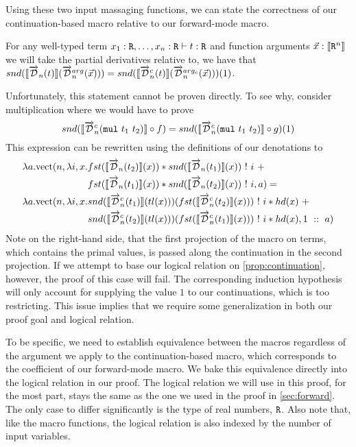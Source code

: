   Using these two input massaging functions, we can state the correctness of our continuation-based macro relative to our forward-mode macro.
  \begin{proposition}\label{prop:continuation}
    For any well-typed term $x_1 : \texttt{R}, \dots, x_n : \texttt{R} \vdash t : \texttt{R}$ and function arguments $\vec{x} : \llbracket \texttt{R}^n \rrbracket$ we will take the partial derivatives relative to, we have that $snd(\llbracket\overrightarrow{\mathcal{D}}_n(t)\rrbracket (\overrightarrow{\mathcal{D}}^{arg}_n(\vec{x}))) = snd(\llbracket\overrightarrow{\mathcal{D}}^c_n(t)\rrbracket (\overrightarrow{\mathcal{D}}^{arg_c}_n(\vec{x})))(1)$.
  \end{proposition}
  Unfortunately, this statement cannot be proven directly.
  To see why, consider multiplication where we would have to prove
  \begin{equation*}
    snd(\llbracket \overrightarrow{\mathcal{D}}^c_n(\texttt{mul}\ t_1\ t_2) \rrbracket \circ f)= snd(\llbracket \overrightarrow{\mathcal{D}}^c_n(\texttt{mul}\ t_1\ t_2) \rrbracket \circ g)(1)
  \end{equation*}
  This expression can be rewritten using the definitions of our denotations to
  \begin{align*}
    \lambda a. \text{vect}(n, \lambda i, x. &fst(\llbracket \overrightarrow{\mathcal{D}}_n(t_2) \rrbracket(x)) * snd(\llbracket \overrightarrow{\mathcal{D}}_n(t_1)\rrbracket(x))\ !\ i\ + \\
      &fst(\llbracket \overrightarrow{\mathcal{D}}_n(t_1) \rrbracket(x)) * snd(\llbracket \overrightarrow{\mathcal{D}}_n(t_2)\rrbracket(x))\ !\ i, a) = \\
    \lambda a. \text{vect}(n, \lambda i, x. &snd(\llbracket \overrightarrow{\mathcal{D}}^c_n(t_1) \rrbracket(tl(x)))(fst(\llbracket \overrightarrow{\mathcal{D}}^c_n(t_2)\rrbracket(x)))\ !\ i * hd(x)\ + \\
    &snd(\llbracket \overrightarrow{\mathcal{D}}^c_n(t_2) \rrbracket(tl(x)))(fst(\llbracket \overrightarrow{\mathcal{D}}^c_n(t_1)\rrbracket(x)))\ !\ i * hd(x), 1\ ::\ a)
  \end{align*}
  Note on the right-hand side, that the first projection of the macro on terms, which contains the primal values, is passed along the continuation in the second projection.
  If we attempt to base our logical relation on \cref{prop:continuation}, however, the proof of this case will fail.
  The corresponding induction hypothesis will only account for supplying the value $1$ to our continuations, which is too restricting.
  This issue implies that we require some generalization in both our proof goal and logical relation.

  To be specific, we need to establish equivalence between the macros regardless of the argument we apply to the continuation-based macro, which corresponds to the coefficient of our forward-mode macro.
  We bake this equivalence directly into the logical relation in our proof.
  The logical relation we will use in this proof, for the most part, stays the same as the one we used in the proof in \cref{sec:forward}.
  The only case to differ significantly is the type of real numbers, $\texttt{R}$.
  Also note that, like the macro functions, the logical relation is also indexed by the number of input variables.

